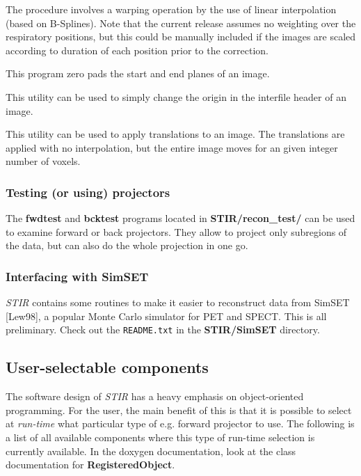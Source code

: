 \documentclass{article}
\begin{document}
The
procedure involves a warping operation by the use of linear interpolation (based
on B-Splines). Note that the current release assumes no weighting over the
respiratory positions, but this could be manually included if the images are
scaled according to duration of each position prior to the correction.


{ 
}

This program zero pads the start and end planes of an image. 

{ 
}

This utility can be used to simply
change the origin in the interfile header of an image. 

{ 
}

This utility can be used to
apply translations to an image. The translations are applied with no
interpolation, but the entire image moves for an given integer number of
voxels. 

\subsubsection{
Testing (or using) projectors}

The \textbf{fwdtest} and \textbf{bcktest} programs located in \textbf{STIR/recon\_test/} can 
be used to examine forward or back projectors. They allow to 
project only subregions of the data, but can also do the whole 
projection in one go. 


\subsubsection{
Interfacing with SimSET}
\textit{STIR} contains some routines to make it easier to reconstruct data from SimSET [Lew98], 
a popular Monte Carlo simulator for PET and SPECT. This
is all preliminary. Check out the \texttt{README.txt} in the \textbf{STIR/SimSET} directory.


\subsection{
User-selectable components}
\label{sec:user-selectablecomponents}
The software design of \textit{STIR} has a heavy emphasis on object-oriented 
programming. For the user, the main benefit of this is that it 
is possible to select at \textit{run-time} what particular type of 
e.g. forward projector to use. The following is a list of all 
available components where this type of run-time selection is 
currently available. In the doxygen documentation, look at the 
class documentation for \textbf{RegisteredObject}.
\end{document}
